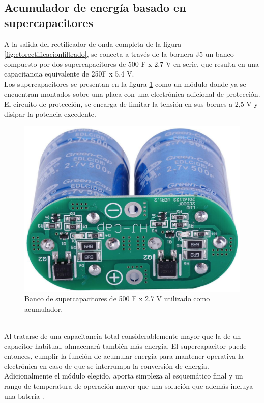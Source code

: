 \subsection{Acumulador de energía basado en supercapacitores}
A la salida del rectificador de onda completa de la figura \ref{fig:ctorectificacionfiltrado}, se conecta a través de la bornera J5 un banco compuesto por dos supercapacitores de 500 F x 2,7 V en serie, que resulta en una capacitancia equivalente de 250F x 5,4 V.\\
Los supercapacitores se presentan en la figura \ref{fig:imagensupercap} como un módulo donde ya se encuentran montados sobre una placa con una electrónica adicional de protección. El circuito de protección, se encarga de limitar la tensión en sus bornes a 2,5 V y disipar la potencia excedente.\\
\begin{figure}[h]
	\centering
	\includegraphics[width=0.6\linewidth]{Figures/imagen_supercap}
	\caption{Banco de supercapacitores de 500 F x 2,7 V utilizado como acumulador.}
	\label{fig:imagensupercap}
\end{figure}\\
Al tratarse de una capacitancia total considerablemente mayor que la de un capacitor habitual, almacenará también más energía. El supercapacitor puede entonces, cumplir la función de acumular energía para mantener operativa la electrónica en caso de que se interrumpa la conversión de energía.\\
Adicionalmente el módulo elegido, aporta simpleza al esquemático final y un rango de temperatura de operación mayor que una solución que además incluya una batería \citep{PORCARELLI20141671}.\\

